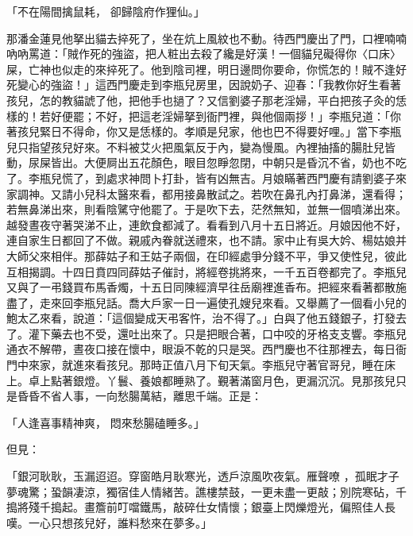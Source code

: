 「不在陽間擒鼠耗，  卻歸陰府作狸仙。」

那潘金蓮見他拏出貓去捽死了，坐在炕上風紋也不動。待西門慶出了門，口裡喃喃吶吶罵道：「賊作死的強盜，把人粧出去殺了纔是好漢！一個貓兒礙得你〈口床〉屎，亡神也似走的來捽死了。他到陰司裡，明日邊問你要命，你慌怎的！賊不逢好死變心的強盜！」這西門慶走到李瓶兒房里，因說奶子、迎春：「我教你好生看著孩兒，怎的教貓諕了他，把他手也撾了？又信劉婆子那老淫婦，平白把孩子灸的恁樣的！若好便罷；不好，把這老淫婦拏到衙門裡，與他個兩拶！」李瓶兒道：「你著孩兒緊日不得命，你又是恁樣的。孝順是兒家，他也巴不得要好哩。」當下李瓶兒只指望孩兒好來。不料被艾火把風氣反于內，變為慢風。內裡抽搐的腸肚兒皆動，尿屎皆出。大便屙出五花顏色，眼目忽睜忽閉，中朝只是昏沉不省，奶也不吃了。李瓶兒慌了，到處求神問卜打卦，皆有凶無吉。月娘瞞著西門慶有請劉婆子來家調神。又請小兒科太醫來看，都用接鼻散試之。若吹在鼻孔內打鼻涕，還看得；若無鼻涕出來，則看陰騭守他罷了。于是吹下去，茫然無知，並無一個噴涕出來。越發晝夜守著哭涕不止，連飲食都減了。看看到八月十五日將近。月娘因他不好，連自家生日都回了不做。親戚內眷就送禮來，也不請。家中止有吳大妗、楊姑娘并大師父來相伴。那薛姑子和王姑子兩個，在印經處爭分錢不平，爭又使性兒，彼此互相揭調。十四日賁四同薛姑子催討，將經卷挑將來，一千五百卷都完了。李瓶兒又與了一弔錢買布馬香燭，十五日同陳經濟早往岳廟裡進香布。把經來看著都散施盡了，走來回李瓶兒話。喬大戶家一日一遍使孔嫂兒來看。又舉薦了一個看小兒的鮑太乙來看，說道：「這個變成天弔客忤，治不得了。」白與了他五錢銀子，打發去了。灌下藥去也不受，還吐出來了。只是把眼合著，口中咬的牙格支支響。李瓶兒通衣不解帶，晝夜口接在懷中，眼淚不乾的只是哭。西門慶也不往那裡去，每日衙門中來家，就進來看孩兒。那時正值八月下旬天氣。李瓶兒守著官哥兒，睡在床上。卓上點著銀燈。丫鬟、養娘都睡熟了。覲著滿窗月色，更漏沉沉。見那孩兒只是昏昏不省人事，一向愁腸萬結，離思千端。正是：

「人逢喜事精神爽，  悶來愁腸磕睡多。」

但見：

「銀河耿耿，玉漏迢迢。穿窗皓月耿寒光，透戶涼風吹夜氣。雁聲嘹 ，孤眠才子夢魂驚；蛩韻凄涼，獨宿佳人情緒苦。譙樓禁鼓，一更未盡一更敲；別院寒砧，千搗將殘千搗起。畫簷前叮噹鐵馬，敲碎仕女情懷；銀臺上閃爍燈光，偏照佳人長嘆。一心只想孩兒好，誰料愁來在夢多。」

